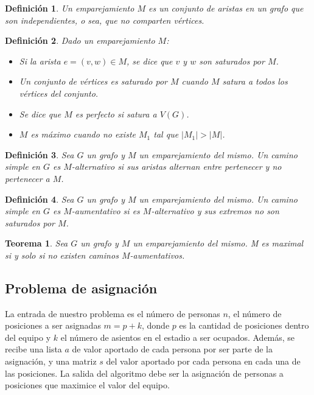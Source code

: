 \documentclass[10pt]{article} %
\newtheorem{thm}{Teorema}
\newtheorem{mydef}{Definici\'on}%
\begin{document}
	\begin{mydef}
		Un emparejamiento $ M $ es un conjunto de aristas en un grafo que son independientes, o sea, que no comparten v\'ertices.
	\end{mydef}
	
	\begin{mydef}
		\label{def:matching}
		Dado un emparejamiento $ M $:
		\begin{itemize}
			\item Si la arista $ e = (v, w) \in M $, se dice que $ v $ y $ w $ son saturados por $ M $.
			\item Un conjunto de v\'ertices es saturado por $ M $ cuando $ M $ satura a todos los v\'ertices del conjunto.
			\item Se dice que $ M $ es perfecto si satura a $ V(G) $.
			\item $ M $ es m\'aximo cuando no existe $ M_{1} $ tal que $ |M_{1}| > |M| $.
		\end{itemize}
	\end{mydef}
	
	\begin{mydef}
		\label{def:alternativo}
		Sea $ G $ un grafo y $ M $ un emparejamiento del mismo. Un camino simple en $ G $ es $ M $-alternativo si sus aristas alternan entre pertenecer y no pertenecer a $ M $.
	\end{mydef}
	
	\begin{mydef}
		\label{def:aumentativo}
		Sea $ G $ un grafo y $ M $ un emparejamiento del mismo. Un camino simple en $ G $ es $ M $-aumentativo si es $ M $-alternativo y sus extremos no son saturados por $ M $.
	\end{mydef}
	
	\begin{thm}
		Sea $ G $ un grafo y $ M $ un emparejamiento del mismo. M es maximal si y solo si no existen caminos $ M $-aumentativos.
	\end{thm}
	
	\subsection{Problema de asignaci\'on}
	
	La entrada de nuestro problema es el n\'umero de personas $ n $, el n\'umero de posiciones a ser asignadas $ m = p + k $, donde $ p $ es la cantidad de posiciones dentro del equipo y $ k $ el n\'umero de asientos en el estadio a ser ocupados. Adem\'as, se recibe una lista $ a $ de valor aportado de cada persona por ser parte de la asignaci\'on, y una matriz $ s $ del valor aportado por cada persona en cada una de las posiciones. La salida del algoritmo debe ser la asignaci\'on de personas a posiciones que maximice el valor del equipo.
	
\end{document}
